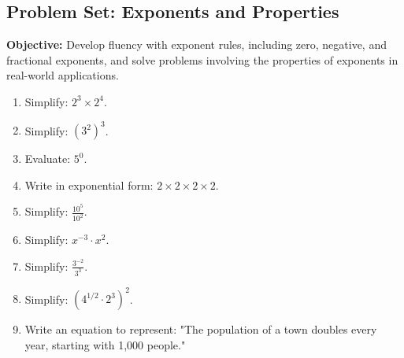 \documentclass[12pt]{article}
\title{}
\date{}
\begin{document}
\subsection*{Problem Set: Exponents and Properties}
\onehalfspacing

\begin{tcolorbox}[colframe=black!40, colback=gray!5, 
coltitle=black, colbacktitle=black!20, fonttitle=\bfseries\Large, 
title=Learning Objective, halign title=center, left=5pt, right=5pt, top=5pt, bottom=15pt]
\textbf{Objective:} Develop fluency with exponent rules, including zero, negative, and fractional exponents, and solve problems involving the properties of exponents in real-world applications.
\end{tcolorbox}

\begin{tcolorbox}[colframe=black!60, colback=white, 
coltitle=black, colbacktitle=black!15, fonttitle=\bfseries\Large, 
title=Exercises, halign title=center, left=10pt, right=10pt, top=10pt, bottom=60pt]
\begin{enumerate}[itemsep=3em]
    \item Simplify: \( 2^3 \times 2^4 \).
    \item Simplify: \( (3^2)^3 \).
    \item Evaluate: \( 5^0 \).
    \item Write in exponential form: \( 2 \times 2 \times 2 \times 2 \).
    \item Simplify: \( \frac{10^5}{10^2} \).
    \item Simplify: \( x^{-3} \cdot x^2 \).
    \item Simplify: \( \frac{3^{-2}}{3^3} \).
    \item Simplify: \( (4^{1/2} \cdot 2^3)^2 \).
    \item Write an equation to represent: "The population of a town doubles every year, starting with 1,000 people."
\end{enumerate}
\end{tcolorbox}

\vspace{1em}
\end{document}

